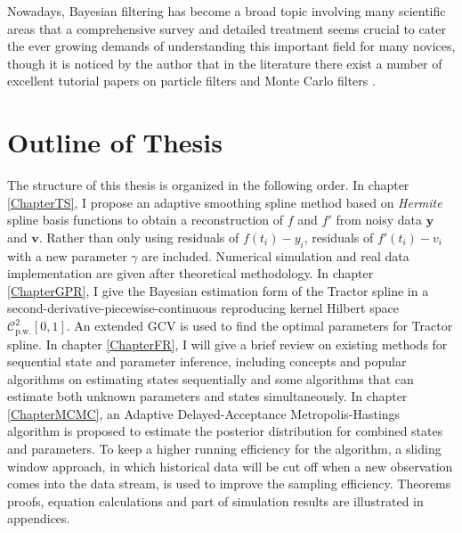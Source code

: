 Nowadays, Bayesian filtering has become a broad topic involving many scientific areas that a comprehensive survey and detailed treatment seems crucial to cater the ever growing demands of understanding this important field for many novices, though it is noticed by the author that in the literature there exist a number of excellent tutorial papers on particle filters and Monte Carlo filters \cite{chen2003bayesian} \cite{doucet2000sequential} \cite{doucet2000rao} \cite{chen2012monte}.  
 
 

\section{Outline of Thesis}

The structure of this thesis is organized in the following order. In chapter \ref{ChapterTS}, I propose an adaptive smoothing spline method based on \textit{Hermite} spline basis functions to obtain a reconstruction of $f$ and $f'$ from noisy data $\mathbf{y}$ and $\mathbf{v}$. Rather than only using residuals of $f(t_i)-y_i$, residuals of $f'(t_i)-v_i$ with a new parameter $\gamma$ are included. Numerical simulation and real data implementation are given after theoretical methodology. In chapter \ref{ChapterGPR}, I give the Bayesian estimation form of the Tractor spline in a second-derivative-piecewise-continuous reproducing kernel Hilbert space $\mathcal{C}_{\mbox{p.w.}}^2[0,1]$. An extended GCV is used to find the optimal parameters for Tractor spline. In chapter \ref{ChapterFR}, I will give a brief review on existing methods for sequential state and parameter inference, including concepts and popular algorithms on estimating states sequentially and some algorithms that can estimate both unknown parameters and states simultaneously. In chapter \ref{ChapterMCMC}, an Adaptive Delayed-Acceptance Metropolis-Hastings algorithm is proposed to estimate the posterior distribution for combined states and parameters. To keep a higher running efficiency for the algorithm, a sliding window approach, in which historical data will be cut off when a new observation comes into the data stream,  is used to improve the sampling efficiency. Theorems proofs, equation calculations and part of simulation results are illustrated in appendices. 







